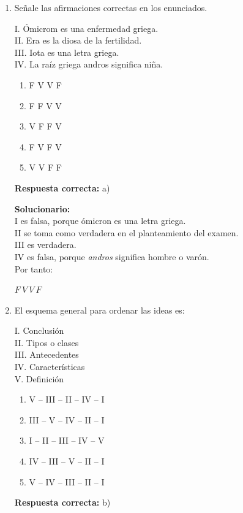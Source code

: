 \begin{enumerate}
	\vspace{2mm}
	\textbf{Solucionario:}\\
	“Afección” es el término más general, porque puede incluir diversas enfermedades, trastornos o alteraciones.
	
	\vspace{6mm}
	
	\item Señale las afirmaciones correctas en los enunciados.
	
	I. Ómicrom es una enfermedad griega.\\
	II. Era es la diosa de la fertilidad.\\
	III. Iota es una letra griega.\\
	IV. La raíz griega andros significa niña.
	
	\begin{enumerate}[label=\alph*)]
		\item F V V F
		\item F F V V
		\item V F F V
		\item F V F V
		\item V V F F
	\end{enumerate}
	\textbf{Respuesta correcta:} a)
	
	\vspace{2mm}
	\textbf{Solucionario:}\\
	I es falsa, porque ómicron es una letra griega.\\
	II se toma como verdadera en el planteamiento del examen.\\
	III es verdadera.\\
	IV es falsa, porque \textit{andros} significa hombre o varón.\\
	Por tanto:
	
	$F\ V\ V\ F$
	
	\vspace{6mm}
	
	\item El esquema general para ordenar las ideas es:
	
	I. Conclusión\\
	II. Tipos o clases\\
	III. Antecedentes\\
	IV. Características\\
	V. Definición
	
	\begin{enumerate}[label=\alph*)]
		\item V -- III -- II -- IV -- I
		\item III -- V -- IV -- II -- I
		\item I -- II -- III -- IV -- V
		\item IV -- III -- V -- II -- I
		\item V -- IV -- III -- II -- I
	\end{enumerate}
	\textbf{Respuesta correcta:} b)
	

\end{enumerate}
